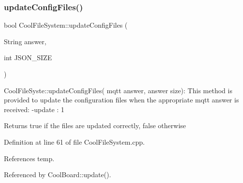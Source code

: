 \subsubsection{\texorpdfstring{update\+Config\+Files()}{updateConfigFiles()}}
{\footnotesize\ttfamily bool Cool\+File\+System\+::update\+Config\+Files (\begin{DoxyParamCaption}\item[{String}]{answer,  }\item[{int}]{J\+S\+O\+N\+\_\+\+S\+I\+ZE }\end{DoxyParamCaption})}

Cool\+File\+Syste\+::update\+Config\+Files( mqtt answer, answer size)\+: This method is provided to update the configuration files when the appropriate mqtt answer is received\+: -\/update \+: 1

\begin{DoxyReturn}{Returns}
true if the files are updated correctly, false otherwise 
\end{DoxyReturn}


Definition at line 61 of file Cool\+File\+System.\+cpp.



References temp.



Referenced by Cool\+Board\+::update().


